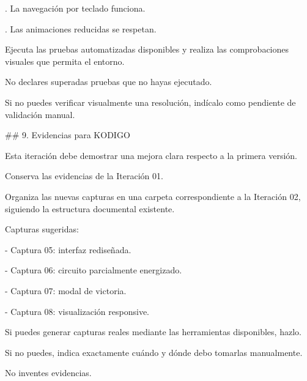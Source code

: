 . La navegación por teclado funciona.\par
{}. Las animaciones reducidas se respetan.\par
\par\smallskip
\noindent Ejecuta las pruebas automatizadas disponibles y realiza las comprobaciones visuales que permita el entorno.\par
\par\smallskip
\noindent No declares superadas pruebas que no hayas ejecutado.\par
\par\smallskip
\noindent Si no puedes verificar visualmente una resolución, indícalo como pendiente de validación manual.\par
\par\smallskip
\noindent \#\# 9. Evidencias para KODIGO\par
\par\smallskip
\noindent Esta iteración debe demostrar una mejora clara respecto a la primera versión.\par
\par\smallskip
\noindent Conserva las evidencias de la Iteración 01.\par
\par\smallskip
\noindent Organiza las nuevas capturas en una carpeta correspondiente a la Iteración 02, siguiendo la estructura documental existente.\par
\par\smallskip
\noindent Capturas sugeridas:\par
\par\smallskip
\noindent - Captura 05: interfaz rediseñada.\par
\noindent - Captura 06: circuito parcialmente energizado.\par
\noindent - Captura 07: modal de victoria.\par
\noindent - Captura 08: visualización responsive.\par
\par\smallskip
\noindent Si puedes generar capturas reales mediante las herramientas disponibles, hazlo.\par
\par\smallskip
\noindent Si no puedes, indica exactamente cuándo y dónde debo tomarlas manualmente.\par
\par\smallskip
\noindent No inventes evidencias.\par
\par\smallskip

